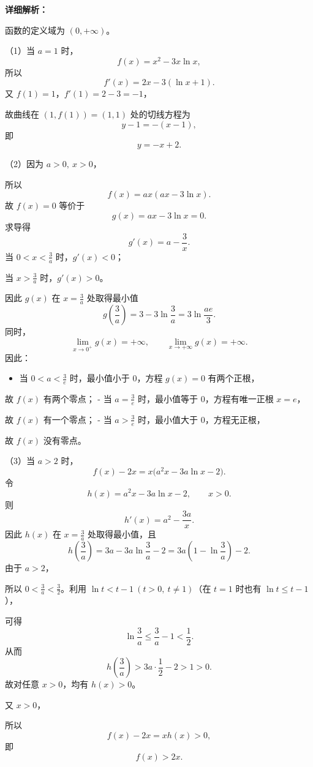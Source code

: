 \documentclass[UTF8,11pt,a4paper]{ctexart}
\providecommand{\tightlist}{%
  \setlength{\itemsep}{0pt}\setlength{\parskip}{0pt}}
\begin{document}
\textbf{详细解析：}

函数的定义域为 \((0,+\infty)\)。


\par\smallskip\noindent（1）当 \(a=1\) 时，
\[
   f(x)=x^2-3x\ln x,
   \]
所以
\[
   f'(x)=2x-3(\ln x+1).
   \]
又 \(f(1)=1\)，\(f'(1)=2-3=-1\)，

故曲线在 \((1,f(1))=(1,1)\) 处的切线方程为
\[
   y-1=-(x-1),
   \]
即
\[
   \boxed{y=-x+2}.
   \]


\par\smallskip\noindent（2）因为 \(a>0,\ x>0\)，

所以
\[
   f(x)=ax(ax-3\ln x).
   \]
故 \(f(x)=0\) 等价于
\[
   g(x)=ax-3\ln x=0.
   \]
求导得
\[
   g'(x)=a-\frac3x.
   \]
当 \(0<x<\frac3a\) 时，\(g'(x)<0\)；

当 \(x>\frac3a\) 时，\(g'(x)>0\)。

因此 \(g(x)\) 在 \(x=\frac3a\) 处取得最小值
\[
   g\left(\frac3a\right)
   =3-3\ln\frac3a
   =3\ln\dfrac{ae}{3}.
   \]
同时，
\[
   \lim_{x\to0^+}g(x)=+\infty,\qquad
   \lim_{x\to+\infty}g(x)=+\infty.
   \]
因此：

\begin{itemize}
\tightlist
\item
  当 \(0<a<\frac3e\) 时，最小值小于 \(0\)，方程 \(g(x)=0\) 有两个正根，
\end{itemize}

故 \(f(x)\) 有两个零点；
- 当 \(a=\frac3e\) 时，最小值等于 \(0\)，方程有唯一正根 \(x=e\)，

故 \(f(x)\) 有一个零点；
- 当 \(a>\frac3e\) 时，最小值大于 \(0\)，方程无正根，

故 \(f(x)\) 没有零点。


\par\smallskip\noindent（3）当 \(a>2\) 时，
\[
   f(x)-2x
   =x\bigl(a^2x-3a\ln x-2\bigr).
   \]
令
\[
   h(x)=a^2x-3a\ln x-2,\qquad x>0.
   \]
则
\[
   h'(x)=a^2-\dfrac{3a}{x}.
   \]
因此 \(h(x)\) 在 \(x=\frac3a\) 处取得最小值，且
\[
   h\left(\frac3a\right)
   =3a-3a\ln\frac3a-2
   =3a\left(1-\ln\frac3a\right)-2.
   \]
由于 \(a>2\)，

所以 \(0<\frac3a<\frac32\)。利用 \(\ln t<t-1\ (t>0,\ t\ne1)\)（在 \(t=1\) 时也有 \(\ln t\le t-1\)），

可得
\[
   \ln\frac3a\leqslant\frac3a-1<\frac12.
   \]
从而
\[
   h\left(\frac3a\right)
   >3a\cdot\frac12-2
   >1>0.
   \]
故对任意 \(x>0\)，均有 \(h(x)>0\)。

又 \(x>0\)，

所以
\[
   f(x)-2x=xh(x)>0,
   \]
即
\[
   \boxed{f(x)>2x}.
   \]
\end{document}
